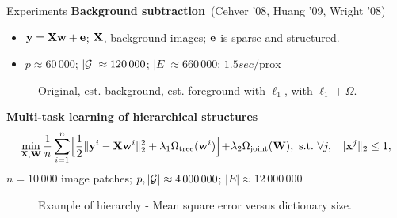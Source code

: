 \documentclass[final]{beamer}
\begin{document}
\begin{frame}{}
\begin{columns}[T]
\begin{column}{0.315\linewidth}
\begin{block}{Experiments}
{\bfseries Background subtraction}~{\small (Cehver '08, Huang '09, Wright '08)}
\begin{itemize}
\item ${\mathbf y} = {\mathbf X}{\mathbf w} + {\mathbf e}$; ${\mathbf X}$, background images; ${\mathbf e}$ is sparse and structured.
\item $p \approx 60\,000$; $|{\mathcal G}| \approx 120\,000$; $|E| \approx 660\,000$; $1.5sec / \text{prox}$
\end{itemize}
   \begin{figure}
      \centering
    \caption{{\small Original, est. background, est. foreground with $\ell_1$, with $\ell_1+\Omega$.}}
   \end{figure}
\vspace*{-0.3cm}
{\bfseries Multi-task learning of hierarchical structures}
   \begin{displaymath}
    \min_{\X,\W}
    \frac{1}{n}\sum_{i=1}^n\!\Big[\frac{1}{2} \|\y^i-\X\w^i\|_2^2 + \lambda_1 \Omega_{\text{tree}}(\w^i)\Big]\!+\!\lambda_2\Omega_{\text{joint}}(\W),\ \text{s.t.}\
    \forall j,~~\|\x^j\|_2\leq 1, 
\end{displaymath}
$n=10\,000$ image patches; $p,|{\mathcal G}| \approx 4\,000\,000$; $|E|\approx 12\,000\,000$
\begin{figure}[hbtp]
   \centering
   \caption{Example of hierarchy - Mean square error versus dictionary size. 
   } \label{fig:tree}
\end{figure}
\end{block}
\end{column}
\end{columns}

\end{frame}
\end{document}
